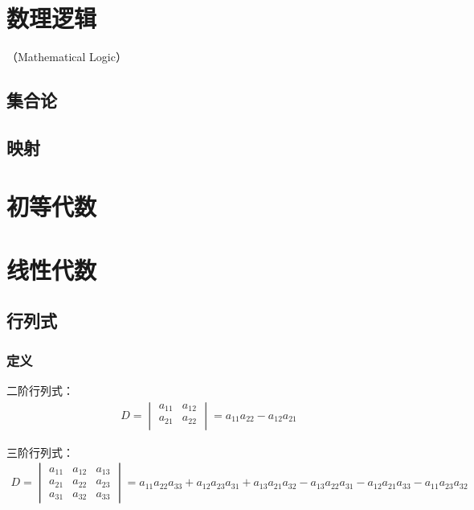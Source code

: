 \documentclass[12pt]{book}
\begin{document}
\chapter{数理逻辑}

（Mathematical Logic）












\section{集合论}



\section{映射}


\chapter{初等代数}





\chapter{线性代数}







\section{行列式}


\subsection{定义}

二阶行列式：
\begin{gather*}
    D = \begin{vmatrix}
        a_{11} & a_{12} \\
        a_{21} & a_{22} \\
    \end{vmatrix}
    =  a_{11} a_{22} - a_{12} a_{21}
\end{gather*}

三阶行列式：
\begin{gather*}
    D = \begin{vmatrix}
        a_{11} & a_{12} & a_{13} \\
        a_{21} & a_{22} & a_{23} \\
        a_{31} & a_{32} & a_{33} 
    \end{vmatrix}
    = a_{11} a_{22} a_{33} 
    + a_{12} a_{23} a_{31} 
    + a_{13} a_{21} a_{32}
    - a_{13} a_{22} a_{31} 
    - a_{12} a_{21} a_{33} 
    - a_{11} a_{23} a_{32}
\end{gather*}
\end{document}
